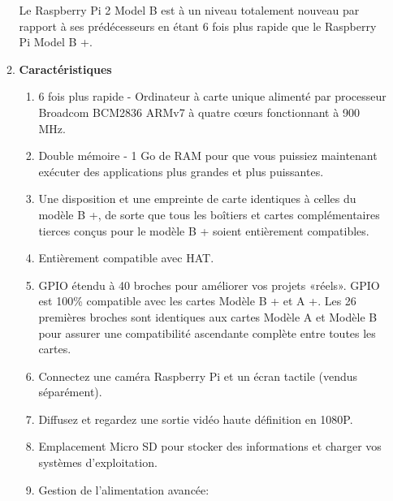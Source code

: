 \documentclass[12pt]{article}
\begin{document}
\begin{itemize}
\begin{enumerate}
		Le Raspberry Pi 2 Model B est à un niveau totalement nouveau par rapport à ses prédécesseurs en étant 6 fois plus rapide que le Raspberry Pi Model B +.
		\item \textbf{Caractéristiques}\\
		\begin{enumerate}
		\item 6 fois plus rapide - Ordinateur à carte unique alimenté par processeur Broadcom BCM2836 ARMv7 à quatre cœurs fonctionnant à 900 MHz.
		\item Double mémoire - 1 Go de RAM pour que vous puissiez maintenant exécuter des applications plus grandes et plus puissantes.
		\item Une disposition et une empreinte de carte identiques à celles du modèle B +, de sorte que tous les boîtiers et cartes complémentaires tierces conçus pour le modèle B + soient entièrement compatibles.
		\item Entièrement compatible avec HAT.
		\item GPIO étendu à 40 broches pour améliorer vos projets «réels». GPIO est 100\% compatible avec les cartes Modèle B + et A +. Les 26 premières broches sont identiques aux cartes Modèle A et Modèle B pour assurer une compatibilité ascendante complète entre toutes les cartes.
		\item Connectez une caméra Raspberry Pi et un écran tactile (vendus séparément).
		\item Diffusez et regardez une sortie vidéo haute définition en 1080P.
		\item Emplacement Micro SD pour stocker des informations et charger vos systèmes d'exploitation.
		\item Gestion de l'alimentation avancée:
		

\end{enumerate}
\end{enumerate}
\end{itemize}
\end{document}
